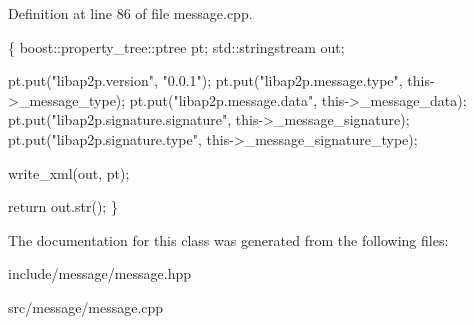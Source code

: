 Definition at line 86 of file message.\-cpp.


\begin{DoxyCode}
\{
        boost::property\_tree::ptree pt;
        std::stringstream out;

        pt.put(\textcolor{stringliteral}{"libap2p.version"}, \textcolor{stringliteral}{"0.0.1"});
        pt.put(\textcolor{stringliteral}{"libap2p.message.type"}, this->\_message\_type);
        pt.put(\textcolor{stringliteral}{"libap2p.message.data"}, this->\_message\_data);
        pt.put(\textcolor{stringliteral}{"libap2p.signature.signature"}, this->\_message\_signature); 
        pt.put(\textcolor{stringliteral}{"libap2p.signature.type"}, this->\_message\_signature\_type);
        
        write\_xml(out, pt);
        
        \textcolor{keywordflow}{return} out.str();
\}
\end{DoxyCode}


The documentation for this class was generated from the following files\-:\begin{DoxyCompactItemize}
\item 
include/message/message.\-hpp\item 
src/message/message.\-cpp\end{DoxyCompactItemize}
